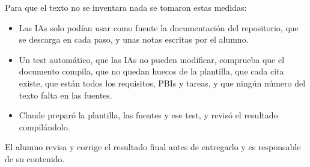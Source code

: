 Para que el texto no se inventara nada se tomaron estas medidas:
\begin{itemize}
    \item Las IAs solo podían usar como fuente la documentación del repositorio, que se descarga en cada paso, y unas notas escritas por el alumno.
    \item Un test automático, que las IAs no pueden modificar, comprueba que el documento compila, que no quedan huecos de la plantilla, que cada cita existe, que están todos los requisitos, PBIs y tareas, y que ningún número del texto falta en las fuentes.
    \item Claude preparó la plantilla, las fuentes y ese test, y revisó el resultado compilándolo.
\end{itemize}

El alumno revisa y corrige el resultado final antes de entregarlo y es responsable de su contenido.

